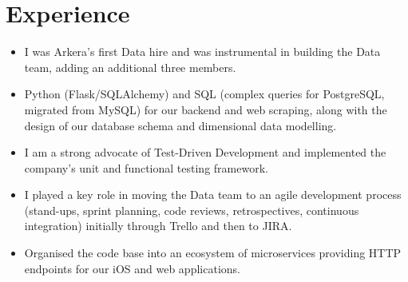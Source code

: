 \documentclass[11pt,a4paper,sans]{moderncv}        %
\begin{document}
\section{Experience}
\vspace*{-0.15cm}
{
\begin{itemize}%
\item I was Arkera's first Data hire and was instrumental in building the Data team, adding an additional three members.
\item Python (Flask/SQLAlchemy) and SQL (complex queries for PostgreSQL, migrated from MySQL) for our backend and web scraping, along with the design of our database schema and dimensional data modelling.
\item I am a strong advocate of Test-Driven Development and implemented the company's unit and functional testing framework. 
\item I played a key role in moving the Data team to an agile development process (stand-ups, sprint planning, code reviews, retrospectives, continuous integration) initially through Trello and then to JIRA.
\item Organised the code base into an ecosystem of microservices providing HTTP endpoints for our iOS and web applications.
\end{itemize}}
\end{document}
